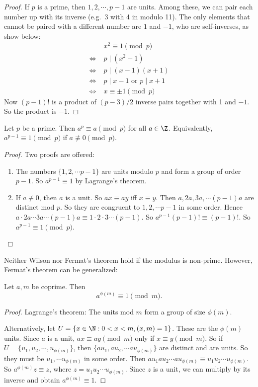 \documentclass[a4paper]{article}
\begin{document}
\begin{proof}
  If $p$ is a prime, then $1, 2, \cdots, p - 1$ are units. Among these, we can pair each number up with its inverse (e.g.\ 3 with 4 in modulo 11). The only elements that cannot be paired with a different number are $1$ and $-1$, who are self-inverses, as show below:
  \begin{align*}
    &\;x^2 \equiv 1\pmod p\\
    \Leftrightarrow&\; p \mid (x^2 - 1)\\
    \Leftrightarrow&\; p \mid (x - 1)(x + 1)\\
    \Leftrightarrow&\; p \mid x - 1 \text{ or } p \mid x + 1\\
    \Leftrightarrow&\; x \equiv \pm 1\pmod p
  \end{align*}
  Now $(p - 1)!$ is a product of $(p - 3)/2$ inverse pairs together with 1 and $-1$. So the product is $-1$.
\end{proof}

\begin{thm}
  Let $p$ be a prime. Then $a^p \equiv a\pmod p$ for all $a\in \Z$. Equivalently, $a^{p - 1}\equiv 1\pmod p$ if $a\not\equiv 0 \pmod p$.
\end{thm}

\begin{proof}
  Two proofs are offered:
  \begin{enumerate}
    \item The numbers $\{1, 2, \cdots p - 1\}$ are units modulo $p$ and form a group of order $p - 1$. So $a^{p - 1} \equiv 1$ by Lagrange's theorem.
    \item If $a\not\equiv 0$, then $a$ is a unit. So $ax \equiv ay$ iff $x\equiv y$. Then $a, 2a, 3a, \cdots (p - 1)a$ are distinct mod $p$. So they are congruent to $1, 2, \cdots p -1$ in some order. Hence $a\cdot 2a\cdots 3a\cdots (p - 1)a\equiv 1\cdot 2\cdot 3 \cdots (p - 1)$. So $a^{p - 1}(p - 1)! \equiv (p - 1)!$. So $a^{p - 1} \equiv 1\pmod p$.\qedhere
  \end{enumerate}
\end{proof}
Neither Wilson nor Fermat's theorem hold if the modulus is non-prime. However, Fermat's theorem can be generalized:
\begin{thm}
  Let $a, m$ be coprime. Then
  \[
    a^{\phi(m)} \equiv 1\pmod m.
  \]
\end{thm}

\begin{proof}
  Lagrange's theorem: The units mod $m$ form a group of size $\phi(m)$.

  Alternatively, let $U = \{x\in \N: 0 < x < m, (x, m) = 1\}$. These are the $\phi(m)$ units. Since $a$ is a unit, $ax\equiv ay \pmod m$ only if $x\equiv y\pmod m$. So if $U = \{u_1, u_2, \cdots , u_{\phi(m)}\}$, then $\{au_1, au_2, \cdots au_{\phi(m)}\}$ are distinct and are units. So they must be $u_1, \cdots u_{\phi(m)}$ in some order. Then $au_1au_2\cdots au_{\phi(m)} \equiv u_1u_2\cdots u_{\phi(m)}$. So $a^{\phi(m)}z \equiv z$, where $z = u_1u_2\cdots u_{\phi(m)}$. Since $z$ is a unit, we can multiply by its inverse and obtain $a^{\phi(m)} \equiv 1$.
\end{proof}
\end{document}
